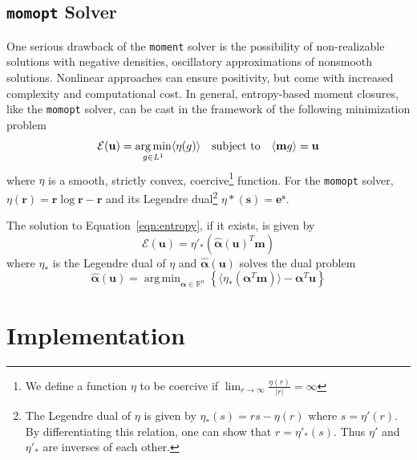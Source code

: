 \documentclass{article}
\newcommand{\R}{\ensuremath{\mathbb{R}}\xspace}
\DeclareMathOperator*{\argmin}{arg\,min}
\newcommand{\integral}[1]{\ensuremath{\langle #1 \rangle}}
\newcommand{\moment}{\texttt{moment}\xspace}
\newcommand{\momopt}{\texttt{momopt}\xspace}
\begin{document}
\subsection{\momopt Solver}
One serious drawback of the \moment solver is the possibility of non-realizable
solutions with negative densities, oscillatory approximations of nonsmooth
solutions. Nonlinear approaches can ensure positivity,
but come with increased complexity and computational cost. In general,
entropy-based moment closures, like the \momopt solver, can be cast in the
framework of the following minimization problem
\begin{equation}
    \label{eqn:entropy}
    \mathcal{E}(\mathbf{u}) = \argmin_{g \in L^1} \integral{\eta(g)} \quad
    \textnormal{subject to} \quad \integral{\mathbf{m}g} = \mathbf{u}
\end{equation}
where $\eta$ is a smooth, strictly convex, coercive\footnote{We define a
function $\eta$ to be coercive if
$\lim_{r \to \infty} \frac{\eta(r)}{|r|} = \infty$} function. For the
\momopt solver, $\eta(\mathbf{r}) = \mathbf{r} \log \mathbf{r} - \mathbf{r}$
and its Legendre dual\footnote{The Legendre dual of $\eta$ is given by
$\eta_*(s) = rs - \eta(r)$ where $s = \eta'(r)$. By differentiating this
relation, one can show that $r = \eta'_*(s)$. Thus $\eta'$ and $\eta'_*$ are
inverses of each other.} $\eta*(\mathbf{s}) = \mathbf{e^s}$.

The solution to Equation~\ref{eqn:entropy}, if it exists, is given by
\begin{equation}
    \mathcal{E}(\mathbf{u}) = \eta'_*(\hat{\mathbf{\alpha}}(\mathbf{u})^T \mathbf{m})
\end{equation}
where $\eta_*$ is the Legendre dual of $\eta$ and $\hat{\mathbf{\alpha}}(\mathbf{u})$
solves the dual problem
\begin{equation}
    \hat{\mathbf{\alpha}}(\mathbf{u}) = \argmin_{\mathbf{\alpha} \in \R^n}
    \left\{ \integral{\eta_*(\mathbf{\alpha}^T\mathbf{m})} -
    \mathbf{\alpha}^T \mathbf{u} \right\}
\end{equation}

\section{Implementation}
\end{document}
